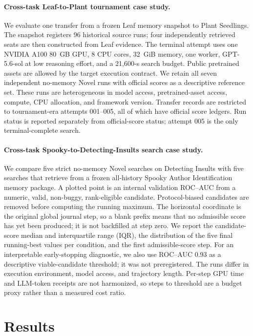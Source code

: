 \documentclass{article}
\begin{document}
\paragraph{Cross-task Leaf-to-Plant tournament case study.}
We evaluate one transfer from a frozen Leaf memory snapshot to Plant Seedlings.
The snapshot registers 96 historical source runs; four independently retrieved
seats are then constructed from Leaf evidence.  The terminal attempt uses one
NVIDIA A100 80~GB GPU, 8 CPU cores, 32~GiB memory, one worker,
GPT-5.6-sol at low reasoning effort, and a 21,600-s search budget.  Public
pretrained assets are allowed by the target execution contract.  We retain all
seven independent no-memory Novel runs with official scores as a descriptive
reference set.  These runs are heterogeneous in model access, pretrained-asset
access, compute, CPU allocation, and framework version.  Transfer records are
restricted to tournament-era attempts 001--005, all of which have official
score ledgers.  Run status is reported separately from official-score status;
attempt 005 is the only terminal-complete search.

\paragraph{Cross-task Spooky-to-Detecting-Insults search case study.}
We compare five strict no-memory Novel searches on Detecting Insults with five
searches that retrieve from a frozen all-history Spooky Author Identification
memory package.  A plotted point is an internal validation ROC--AUC from a
numeric, valid, non-buggy, rank-eligible candidate.  Protocol-biased candidates
are removed before computing the running maximum.  The horizontal coordinate
is the original global journal step, so a blank prefix means that no admissible
score has yet been produced; it is not backfilled at step zero.  We report the
candidate-score median and interquartile range (IQR), the distribution of the
five final running-best values per condition, and the first admissible-score
step.  For an interpretable early-stopping diagnostic, we also use ROC--AUC
0.93 as a descriptive viable-candidate threshold; it was not preregistered.
The runs differ in execution environment, model access, and trajectory length.
Per-step GPU time and LLM-token receipts are not harmonized, so steps to
threshold are a budget proxy rather than a measured cost ratio.

\section{Results}
\end{document}
